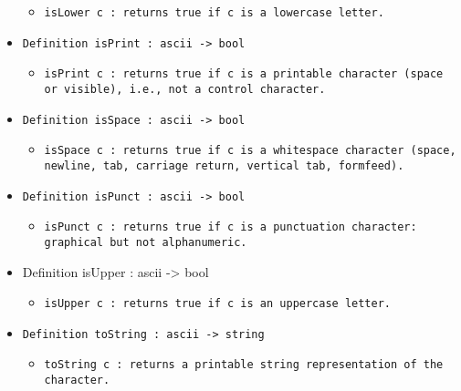 \documentclass[11pt]{report}
\begin{document}
\begin{itemize}
\begin{itemize}
\item  \texttt{isLower c :  returns true if c is a lowercase letter.}
\end{itemize}

\item  \texttt{Definition isPrint : ascii -> bool}

\begin{itemize}
\item  \begin{flushleft} \texttt{isPrint c :  returns true if c is a printable character (space or visible), i.e., not a control character.} \end{flushleft}
\end{itemize}

\item  \texttt{Definition isSpace : ascii -> bool}

\begin{itemize}
\item  \begin{flushleft} \texttt{isSpace c : returns true if c is a whitespace character (space, newline, tab, carriage return, vertical tab, formfeed).} \end{flushleft}
\end{itemize}

\item  \texttt{Definition isPunct : ascii -> bool}

\begin{itemize}
\item  \begin{flushleft} \texttt{isPunct c : returns true if c is a punctuation character: graphical but not alphanumeric.} \end{flushleft}
\end{itemize}

\item  Definition isUpper : ascii -> bool

\begin{itemize}
\item  \texttt{isUpper c :  returns true if c is an uppercase letter.}
\end{itemize}

\item  \texttt{Definition toString : ascii -> string}

\begin{itemize}
\item  \texttt{toString c : returns a printable string representation of the character.} 
\end{itemize}


\end{itemize}
\end{document}
